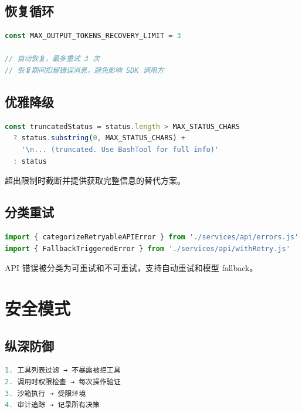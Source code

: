 \subsection{恢复循环}

\begin{lstlisting}[language=TypeScript,breaklines=true]
const MAX_OUTPUT_TOKENS_RECOVERY_LIMIT = 3

// 自动恢复，最多重试 3 次
// 恢复期间扣留错误消息，避免影响 SDK 调用方
\end{lstlisting}

\subsection{优雅降级}

\begin{lstlisting}[language=TypeScript,breaklines=true]
const truncatedStatus = status.length > MAX_STATUS_CHARS
  ? status.substring(0, MAX_STATUS_CHARS) +
    '\n... (truncated. Use BashTool for full info)'
  : status
\end{lstlisting}

超出限制时截断并提供获取完整信息的替代方案。

\subsection{分类重试}

\begin{lstlisting}[language=TypeScript,breaklines=true]
import { categorizeRetryableAPIError } from './services/api/errors.js'
import { FallbackTriggeredError } from './services/api/withRetry.js'
\end{lstlisting}

API 错误被分类为可重试和不可重试，支持自动重试和模型 fallback。

\section{安全模式}

\subsection{纵深防御}

\begin{lstlisting}[language=TypeScript,breaklines=true]
1. 工具列表过滤 → 不暴露被拒工具
2. 调用时权限检查 → 每次操作验证
3. 沙箱执行 → 受限环境
4. 审计追踪 → 记录所有决策
\end{lstlisting}

